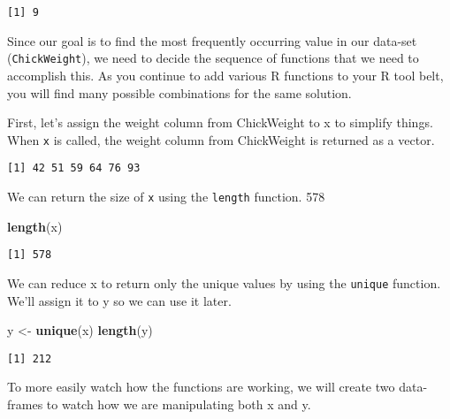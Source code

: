 \documentclass[12pt,]{article}
\newenvironment{Shaded}{\begin{snugshade}}{\end{snugshade}}
\newcommand{\KeywordTok}[1]{\textcolor[rgb]{0.13,0.29,0.53}{\textbf{#1}}}
\newcommand{\StringTok}[1]{\textcolor[rgb]{0.31,0.60,0.02}{#1}}
\newcommand{\OperatorTok}[1]{\textcolor[rgb]{0.81,0.36,0.00}{\textbf{#1}}}
\newcommand{\NormalTok}[1]{#1}
\theoremstyle{definition}
\theoremstyle{definition}
\theoremstyle{definition}
\theoremstyle{remark}
\begin{document}
\begin{verbatim}
[1] 9
\end{verbatim}

Since our goal is to find the most frequently occurring value in our
data-set (\texttt{ChickWeight}), we need to decide the sequence of
functions that we need to accomplish this. As you continue to add
various R functions to your R tool belt, you will find many possible
combinations for the same solution.

First, let's assign the weight column from ChickWeight to x to simplify
things. When \texttt{x} is called, the weight column from ChickWeight is
returned as a vector.

\begin{Shaded}
\end{Shaded}

\begin{verbatim}
[1] 42 51 59 64 76 93
\end{verbatim}

We can return the size of \texttt{x} using the \texttt{length} function.
578

\begin{Shaded}
\begin{Highlighting}[]
\KeywordTok{length}\NormalTok{(x)}
\end{Highlighting}
\end{Shaded}

\begin{verbatim}
[1] 578
\end{verbatim}

We can reduce x to return only the unique values by using the
\texttt{unique} function. We'll assign it to y so we can use it later.

\begin{Shaded}
\begin{Highlighting}[]
\NormalTok{y <-}\StringTok{ }\KeywordTok{unique}\NormalTok{(x)}
\KeywordTok{length}\NormalTok{(y)}
\end{Highlighting}
\end{Shaded}

\begin{verbatim}
[1] 212
\end{verbatim}

To more easily watch how the functions are working, we will create two
data-frames to watch how we are manipulating both x and y.
\end{document}
